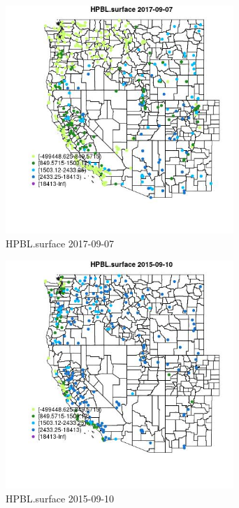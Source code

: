 \begin{figure} 
\centering  
\includegraphics[width=0.77\textwidth]{Code_Outputs/Report_ML_input_PM25_Step4_part_e_de_duplicated_aves_compiled_2019-05-21wNAs_MapObsHPBLsurface2017-09-07.jpg} 
\caption{\label{fig:Report_ML_input_PM25_Step4_part_e_de_duplicated_aves_compiled_2019-05-21wNAsMapObsHPBLsurface2017-09-07}HPBL.surface 2017-09-07} 
\end{figure} 
 

\begin{figure} 
\centering  
\includegraphics[width=0.77\textwidth]{Code_Outputs/Report_ML_input_PM25_Step4_part_e_de_duplicated_aves_compiled_2019-05-21wNAs_MapObsHPBLsurface2015-09-10.jpg} 
\caption{\label{fig:Report_ML_input_PM25_Step4_part_e_de_duplicated_aves_compiled_2019-05-21wNAsMapObsHPBLsurface2015-09-10}HPBL.surface 2015-09-10} 
\end{figure} 
 


